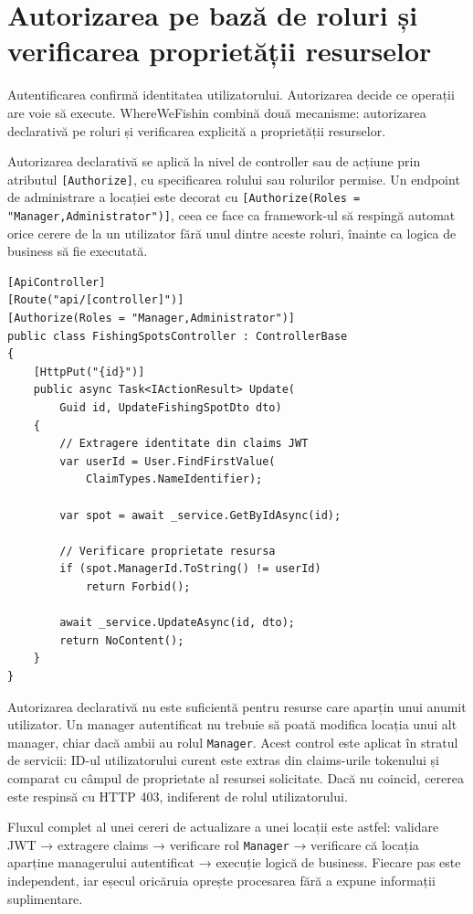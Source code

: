 \section[Autorizare pe roluri și proprietate]{Autorizarea pe bază de roluri și verificarea proprietății resurselor}

Autentificarea confirmă identitatea utilizatorului. Autorizarea decide ce operații are voie să execute. WhereWeFishin combină două mecanisme: autorizarea declarativă pe roluri și verificarea explicită a proprietății resurselor.

Autorizarea declarativă se aplică la nivel de controller sau de acțiune prin atributul \texttt{[Authorize]}, cu specificarea rolului sau rolurilor permise. Un endpoint de administrare a locației este decorat cu \texttt{[Authorize(Roles = "Manager,Administrator")]}, ceea ce face ca framework-ul să respingă automat orice cerere de la un utilizator fără unul dintre aceste roluri, înainte ca logica de business să fie executată.

\begin{lstlisting}[language={[Sharp]C}, caption={Autorizare pe rol și verificarea proprietății resursei}]
[ApiController]
[Route("api/[controller]")]
[Authorize(Roles = "Manager,Administrator")]
public class FishingSpotsController : ControllerBase
{
    [HttpPut("{id}")]
    public async Task<IActionResult> Update(
        Guid id, UpdateFishingSpotDto dto)
    {
        // Extragere identitate din claims JWT
        var userId = User.FindFirstValue(
            ClaimTypes.NameIdentifier);

        var spot = await _service.GetByIdAsync(id);

        // Verificare proprietate resursa
        if (spot.ManagerId.ToString() != userId)
            return Forbid();

        await _service.UpdateAsync(id, dto);
        return NoContent();
    }
}
\end{lstlisting}

Autorizarea declarativă nu este suficientă pentru resurse care aparțin unui anumit utilizator. Un manager autentificat nu trebuie să poată modifica locația unui alt manager, chiar dacă ambii au rolul \texttt{Manager}. Acest control este aplicat în stratul de servicii: ID-ul utilizatorului curent este extras din claims-urile tokenului și comparat cu câmpul de proprietate al resursei solicitate. Dacă nu coincid, cererea este respinsă cu HTTP 403, indiferent de rolul utilizatorului.

Fluxul complet al unei cereri de actualizare a unei locații este astfel: validare JWT → extragere claims → verificare rol \texttt{Manager} → verificare că locația aparține managerului autentificat → execuție logică de business. Fiecare pas este independent, iar eșecul oricăruia oprește procesarea fără a expune informații suplimentare.

